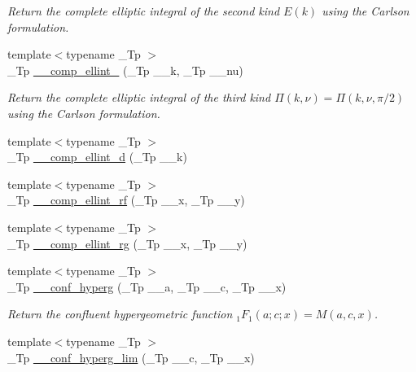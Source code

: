 \begin{DoxyCompactItemize}
\begin{DoxyCompactList}\small\item\em Return the complete elliptic integral of the second kind $ E(k) $ using the Carlson formulation. \end{DoxyCompactList}\item 
{\footnotesize template$<$typename \+\_\+\+Tp $>$ }\\\+\_\+\+Tp \hyperlink{namespacestd_1_1____detail_a26b35b5d72366d30ac4644db8f2f8be4}{\+\_\+\+\_\+comp\+\_\+ellint\+\_} (\+\_\+\+Tp \+\_\+\+\_\+k, \+\_\+\+Tp \+\_\+\+\_\+nu)
\begin{DoxyCompactList}\small\item\em Return the complete elliptic integral of the third kind $ \Pi(k,\nu) = \Pi(k,\nu,\pi/2) $ using the Carlson formulation. \end{DoxyCompactList}\item 
{\footnotesize template$<$typename \+\_\+\+Tp $>$ }\\\+\_\+\+Tp \hyperlink{namespacestd_1_1____detail_add5220a1ab03915e4a45dc547bb8eef6}{\+\_\+\+\_\+comp\+\_\+ellint\+\_\+d} (\+\_\+\+Tp \+\_\+\+\_\+k)
\item 
{\footnotesize template$<$typename \+\_\+\+Tp $>$ }\\\+\_\+\+Tp \hyperlink{namespacestd_1_1____detail_a41ecec8820344d3575b464ecd4db5171}{\+\_\+\+\_\+comp\+\_\+ellint\+\_\+rf} (\+\_\+\+Tp \+\_\+\+\_\+x, \+\_\+\+Tp \+\_\+\+\_\+y)
\item 
{\footnotesize template$<$typename \+\_\+\+Tp $>$ }\\\+\_\+\+Tp \hyperlink{namespacestd_1_1____detail_a31bb5a6e359c88b5bece8dd73f76a2f9}{\+\_\+\+\_\+comp\+\_\+ellint\+\_\+rg} (\+\_\+\+Tp \+\_\+\+\_\+x, \+\_\+\+Tp \+\_\+\+\_\+y)
\item 
{\footnotesize template$<$typename \+\_\+\+Tp $>$ }\\\+\_\+\+Tp \hyperlink{namespacestd_1_1____detail_a3cb3151857e9ac01bc442c90301365ee}{\+\_\+\+\_\+conf\+\_\+hyperg} (\+\_\+\+Tp \+\_\+\+\_\+a, \+\_\+\+Tp \+\_\+\+\_\+c, \+\_\+\+Tp \+\_\+\+\_\+x)
\begin{DoxyCompactList}\small\item\em Return the confluent hypergeometric function $ {}_1F_1(a;c;x) = M(a,c,x) $. \end{DoxyCompactList}\item 
{\footnotesize template$<$typename \+\_\+\+Tp $>$ }\\\+\_\+\+Tp \hyperlink{namespacestd_1_1____detail_adc839c2b3faad5d78bf64236c5c7af73}{\+\_\+\+\_\+conf\+\_\+hyperg\+\_\+lim} (\+\_\+\+Tp \+\_\+\+\_\+c, \+\_\+\+Tp \+\_\+\+\_\+x)

\end{DoxyCompactItemize}

